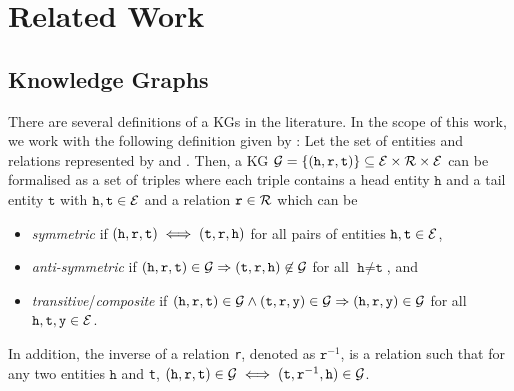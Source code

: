 \chapter{Related Work}
\label{ch:relatedwork}

\section{Knowledge Graphs} 
There are several definitions of a \acp{KG} in the literature. 
In the scope of this work, we work with the following definition given by \cite{ConEx, RotatE}:
Let the set of entities and relations represented by \entities and \relations.
Then, a \ac{KG} $\mathcal{G}= \{(\texttt{h}, \texttt{r}, \texttt{t}) \}  \subseteq \mathcal{E} \times \mathcal{R} \times \mathcal{E}$ can be formalised as a set of triples where each triple contains a head entity $\texttt{h}$ and a tail entity $\texttt{t}$ with $\texttt{h}, \texttt{t} \in \mathcal{E}$ and a relation $\texttt{r} \in \mathcal{R}$ which can be
\begin{itemize}
    \item 
    \emph{symmetric} if $(\texttt{h}, \texttt{r}, \texttt{t}) \iff (\texttt{t}, \texttt{r}, \texttt{h})$ for all pairs of entities $\texttt{h},\texttt{t}\in \mathcal{E}$, 
   
   \item 
   \emph{anti-symmetric} if $(\texttt{h}, \texttt{r}, \texttt{t}) \in \mathcal{G} \Rightarrow (\texttt{t}, \texttt{r}, \texttt{h}) \not \in \mathcal{G}$ for all $\texttt{h} \not= \texttt{t}$, and
    
    \item 
    \emph{transitive}/\emph{composite} if $(\texttt{h}, \texttt{r}, \texttt{t})\in\mathcal{G} \wedge (\texttt{t}, \texttt{r}, \texttt{y}) \in \mathcal{G}  \Rightarrow (\texttt{h}, \texttt{r}, \texttt{y}) \in \mathcal{G}$ for all $\texttt{h},\texttt{t},\texttt{y}\in \mathcal{E}$.
\end{itemize}
In addition, the inverse of a relation \texttt{r}, denoted as $\texttt{r}^{-1}$, is a relation such that for any two entities $\texttt{h}$ and \texttt{t}, $(\texttt{h}, \texttt{r}, \texttt{t}) \in \mathcal{G} \iff (\texttt{t},\texttt{r}^{-1},\texttt{h}) \in \mathcal{G} $.

